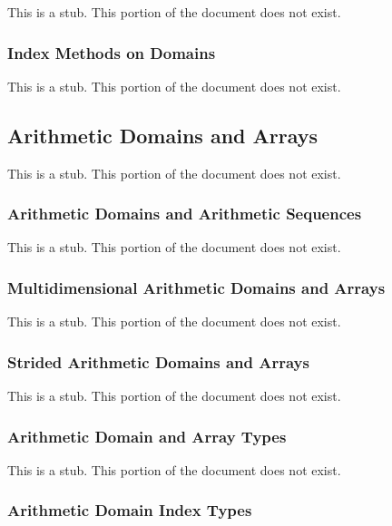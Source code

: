 This is a stub.  This portion of the document does not exist.

\subsubsection{Index Methods on Domains}
\label{Index_Methods_on_Domains}

This is a stub.  This portion of the document does not exist.

\subsection{Arithmetic Domains and Arrays}
\label{Arithmetic_Domains_and_Arrays}

This is a stub.  This portion of the document does not exist.

\subsubsection{Arithmetic Domains and Arithmetic Sequences}
\label{Arithmetic_Domains_and_Arithmetic_Sequences}

This is a stub.  This portion of the document does not exist.

\subsubsection{Multidimensional Arithmetic Domains and Arrays}
\label{Multidimensional_Arithmetic_Domains_and_Arrays}

This is a stub.  This portion of the document does not exist.

\subsubsection{Strided Arithmetic Domains and Arrays}
\label{Strided_Arithmetic_Domains_and_Arrays}

This is a stub.  This portion of the document does not exist.

\subsubsection{Arithmetic Domain and Array Types}
\label{Arithmetic_Domain_and_Array_Types}

This is a stub.  This portion of the document does not exist.

\subsubsection{Arithmetic Domain Index Types}
\label{Arithmetic_Domain_Index_Types}

